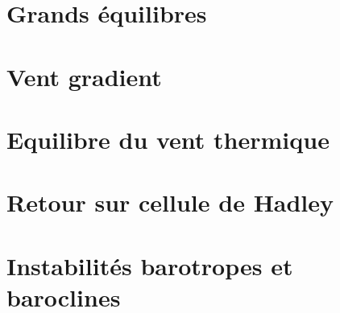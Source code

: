 \documentclass[a4paper,DIV16,10pt]{scrartcl}
\begin{document}
\newpage
\section{Grands équilibres}


\newpage
\section{Vent gradient}


\newpage
\section{Equilibre du vent thermique}


\newpage
\section{Retour sur cellule de Hadley}


\newpage
\section{Instabilités barotropes et baroclines}

\end{document}
